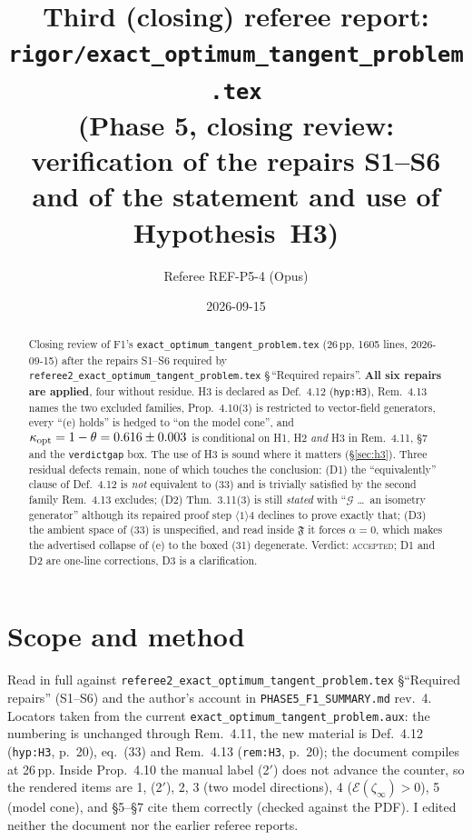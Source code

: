 \documentclass[11pt]{article}
\title{Third (closing) referee report: \texttt{rigor/exact\_optimum\_tangent\_problem.tex}\\
\large (Phase 5, closing review: verification of the repairs S1--S6 and of the
statement and use of Hypothesis~H3)}
\author{Referee REF-P5-4 (Opus)}\date{2026-09-15}
\begin{document}
\maketitle
\begin{abstract}
Closing review of F1's \texttt{exact\_optimum\_tangent\_problem.tex} (26\,pp, 1605 lines,
2026-09-15) after the repairs S1--S6 required by
\texttt{referee2\_exact\_optimum\_tangent\_problem.tex} \S\,``Required repairs''.  \textbf{All
six repairs are applied}, four without residue.  H3 is declared as Def.~4.12
(\texttt{hyp:H3}), Rem.~4.13 names the two excluded families, Prop.~4.10(3) is restricted to
vector-field generators, every ``(e) holds'' is hedged to ``on the model cone'', and
$\kappa_{\rm opt}=1-\theta=0.616\pm0.003$ is conditional on H1, H2 \emph{and} H3 in
Rem.~4.11, \S7 and the \texttt{verdictgap} box.  The
use of H3 is sound where it matters (\S\ref{sec:h3}).  Three residual defects remain,
none of which touches the conclusion: (D1) the ``equivalently'' clause of Def.~4.12 is
\emph{not} equivalent to (33) and is trivially satisfied by the second family
Rem.~4.13 excludes; (D2) Thm.~3.11(3) is still \emph{stated} with ``$\mathcal G$ \dots\ an
isometry generator'' although its repaired proof step $\langle1\rangle4$ declines to prove
exactly that; (D3) the ambient space of (33) is unspecified, and read inside
$\mathfrak F$ it forces $\alpha=0$, which makes the advertised collapse of (e) to the boxed
(31) degenerate.  Verdict: \textsc{accepted}; D1 and D2 are one-line
corrections, D3 is a clarification.
\end{abstract}

\section{Scope and method}\label{sec:scope}
Read in full against \texttt{referee2\_exact\_optimum\_tangent\_problem.tex} \S``Required
repairs'' (S1--S6) and the author's account in \texttt{PHASE5\_F1\_SUMMARY.md} rev.~4.
Locators taken from the current \texttt{exact\_optimum\_tangent\_problem.aux}: the
numbering is unchanged through Rem.~4.11, the new material is Def.~4.12 (\texttt{hyp:H3},
p.~20), eq.~(33) and Rem.~4.13 (\texttt{rem:H3}, p.~20); the document
compiles at 26\,pp.  Inside Prop.~4.10 the manual label (2$'$) does not advance the
counter, so the rendered items are 1, (2$'$), 2, 3 (two model directions),
4 ($\mathcal E(\zeta_\infty)>0$), 5 (model cone), and \S5--\S7 cite them correctly (checked
against the PDF).  I edited neither the document nor the earlier referee reports.
\end{document}
